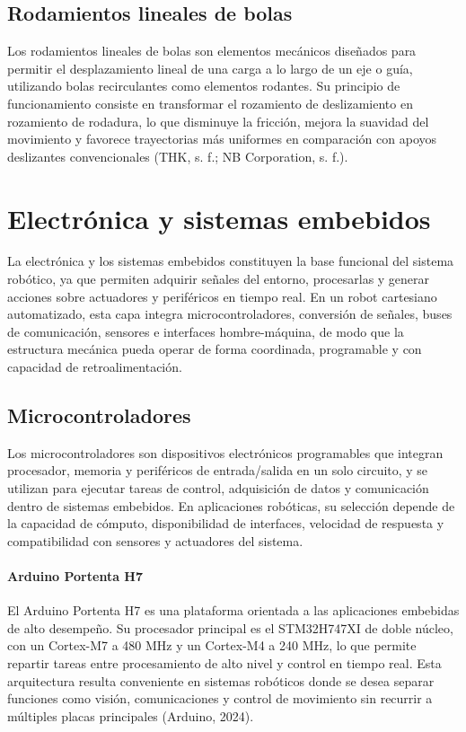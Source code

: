 \subsection{Rodamientos lineales de bolas}
Los rodamientos lineales de bolas son elementos mecánicos diseñados para permitir el desplazamiento lineal de una carga a lo largo de un eje o guía, utilizando bolas recirculantes como elementos rodantes. Su principio de funcionamiento consiste en transformar el rozamiento de deslizamiento en rozamiento de rodadura, lo que disminuye la fricción, mejora la suavidad del movimiento y favorece trayectorias más uniformes en comparación con apoyos deslizantes convencionales (THK, s. f.; NB Corporation, s. f.).


\section{Electrónica y sistemas embebidos}
La electrónica y los sistemas embebidos constituyen la base funcional del sistema robótico, ya que permiten adquirir señales del entorno, procesarlas y generar acciones sobre actuadores y periféricos en tiempo real. En un robot cartesiano automatizado, esta capa integra microcontroladores, conversión de señales, buses de comunicación, sensores e interfaces hombre-máquina, de modo que la estructura mecánica pueda operar de forma coordinada, programable y con capacidad de retroalimentación.

\subsection{Microcontroladores}
Los microcontroladores son dispositivos electrónicos programables que integran procesador, memoria y periféricos de entrada/salida en un solo circuito, y se utilizan para ejecutar tareas de control, adquisición de datos y comunicación dentro de sistemas embebidos. En aplicaciones robóticas, su selección depende de la capacidad de cómputo, disponibilidad de interfaces, velocidad de respuesta y compatibilidad con sensores y actuadores del sistema.

\paragraph{Arduino Portenta H7} El Arduino Portenta H7 es una plataforma orientada a las aplicaciones embebidas de alto desempeño. Su procesador principal es el STM32H747XI de doble núcleo, con un Cortex-M7 a 480 MHz y un Cortex-M4 a 240 MHz, lo que permite repartir tareas entre procesamiento de alto nivel y control en tiempo real. Esta arquitectura resulta conveniente en sistemas robóticos donde se desea separar funciones como visión, comunicaciones y control de movimiento sin recurrir a múltiples placas principales (Arduino, 2024).


